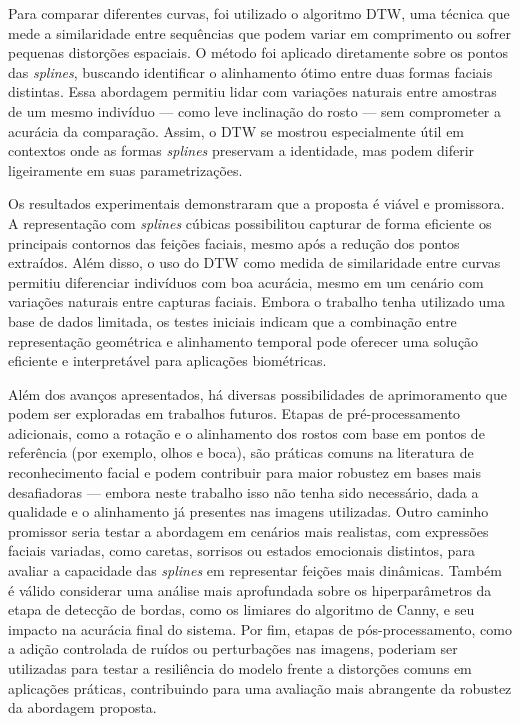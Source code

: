 Para comparar diferentes curvas, foi utilizado o algoritmo DTW, uma técnica que mede a similaridade entre sequências que podem variar em comprimento ou sofrer pequenas distorções espaciais. O método foi aplicado diretamente sobre os pontos das \textit{splines}, buscando identificar o alinhamento ótimo entre duas formas faciais distintas. Essa abordagem permitiu lidar com variações naturais entre amostras de um mesmo indivíduo — como leve inclinação do rosto — sem comprometer a acurácia da comparação. Assim, o DTW se mostrou especialmente útil em contextos onde as formas \textit{splines} preservam a identidade, mas podem diferir ligeiramente em suas parametrizações.


Os resultados experimentais demonstraram que a proposta é viável e promissora. A representação com \textit{splines} cúbicas possibilitou capturar de forma eficiente os principais contornos das feições faciais, mesmo após a redução dos pontos extraídos. Além disso, o uso do DTW como medida de similaridade entre curvas permitiu diferenciar indivíduos com boa acurácia, mesmo em um cenário com variações naturais entre capturas faciais. Embora o trabalho tenha utilizado uma base de dados limitada, os testes iniciais indicam que a combinação entre representação geométrica e alinhamento temporal pode oferecer uma solução eficiente e interpretável para aplicações biométricas.

Além dos avanços apresentados, há diversas possibilidades de aprimoramento que podem ser exploradas em trabalhos futuros. Etapas de pré-processamento adicionais, como a rotação e o alinhamento dos rostos com base em pontos de referência (por exemplo, olhos e boca), são práticas comuns na literatura de reconhecimento facial e podem contribuir para maior robustez em bases mais desafiadoras — embora neste trabalho isso não tenha sido necessário, dada a qualidade e o alinhamento já presentes nas imagens utilizadas. Outro caminho promissor seria testar a abordagem em cenários mais realistas, com expressões faciais variadas, como caretas, sorrisos ou estados emocionais distintos, para avaliar a capacidade das \textit{splines} em representar feições mais dinâmicas. Também é válido considerar uma análise mais aprofundada sobre os hiperparâmetros da etapa de detecção de bordas, como os limiares do algoritmo de Canny, e seu impacto na acurácia final do sistema. Por fim, etapas de pós-processamento, como a adição controlada de ruídos ou perturbações nas imagens, poderiam ser utilizadas para testar a resiliência do modelo frente a distorções comuns em aplicações práticas, contribuindo para uma avaliação mais abrangente da robustez da abordagem proposta.